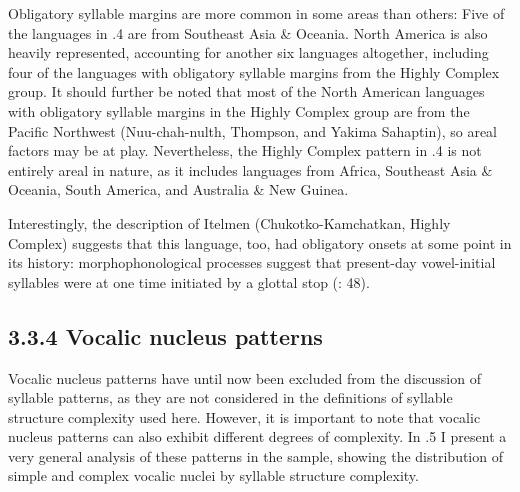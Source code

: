   Obligatory syllable margins are more common in some areas than others: Five of the languages in .4 are from Southeast Asia \& Oceania. North America is also heavily represented, accounting for another six languages altogether, including four of the languages with obligatory syllable margins from the Highly Complex group. It should further be noted that most of the North American languages with obligatory syllable margins in the Highly Complex group are from the Pacific Northwest (Nuu-chah-nulth, Thompson, and Yakima Sahaptin), so areal factors may be at play. Nevertheless, the Highly Complex pattern in .4 is not entirely areal in nature, as it includes languages from Africa, Southeast Asia \& Oceania, South America, and Australia \& New Guinea. 



  Interestingly, the description of Itelmen (Chukotko-Kamchatkan, Highly Complex) suggests that this language, too, had obligatory onsets at some point in its history: morphophonological processes suggest that present-day vowel-initial syllables were at one time initiated by a glottal stop (\citealt{GeorgVolodin1999}: 48).


\subsection{3.3.4 Vocalic nucleus patterns}

  Vocalic nucleus patterns have until now been excluded from the discussion of syllable patterns, as they are not considered in the definitions of syllable structure complexity used here. However, it is important to note that vocalic nucleus patterns can also exhibit different degrees of complexity. In .5 I present a very general analysis of these patterns in the sample, showing the distribution of simple and complex vocalic nuclei by syllable structure complexity.






